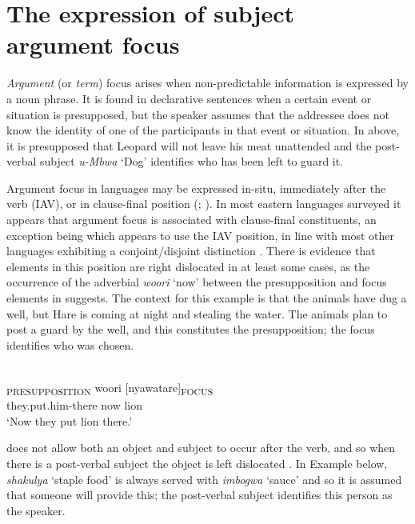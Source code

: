 \documentclass[output=paper]{langsci/langscibook}
\begin{document}
\section{The expression of subject argument focus}\label{§4:expression.nicolle}

\textit{Argument} (or \textit{term}) focus arises when non-predictable information is expressed by a noun phrase. It is found in declarative sentences when a certain event or situation is presupposed, but the speaker assumes that the addressee does not know the identity of one of the participants in that event or situation. In  above, it is presupposed that Leopard will not leave his meat unattended and the post-verbal subject \textit{u}\textit{-Mbwa} ‘Dog’ identifies who has been left to guard it.

Argument focus in  languages may be expressed in-situ, immediately after the verb (IAV), or in clause-final position (\citealt[761--762]{yoneda2011}; \citealt{gibsonetaltoappear}). In most eastern  languages surveyed it appears that argument focus is associated with clause-final constituents, an exception being  which appears to use the IAV position, in line with most other  languages exhibiting a conjoint/disjoint distinction \citep{gibsonetaltoappear}. There is evidence that elements in this position are right dislocated in at least some cases, as the occurrence of the adverbial \textit{woori} ‘now’ between the presupposition and focus elements in  suggests. The context for this example is that the animals have dug a well, but Hare is coming at night and stealing the water. The animals plan to post a guard by the well, and this constitutes the presupposition; the focus identifies who was chosen.

\ea\label{ex:16.nicolle}
\\
\gll [Mbamuta-ko]\textsubscript{PRESUPPOSITION} woori [nyawatare]\textsubscript{FOCUS}\\
{\db}they.put.him-there now {\db}lion\\
\glt ‘Now they put lion there.’
\z

 does not allow both an object and subject to occur after the verb, and so when there is a post-verbal subject the object is left dislocated \citep[91]{leach2015}. In Example  below, \textit{shakulya} ‘staple food’ is always served with \textit{imbogwa} ‘sauce’ and so it is assumed that someone will provide this; the post-verbal subject identifies this person as the speaker.
\end{document}
